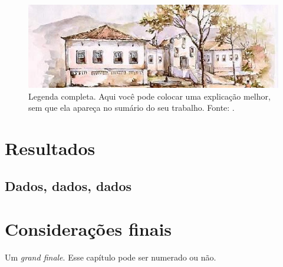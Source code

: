 \documentclass[
	12pt,				%
	openright,			%
	twoside,			%
	a4paper,			%
	english,			%
	brazil				%
	]{abntex2}
\begin{document}
\lipsum[30]

\begin{figure}[htbp]
	\centering
	\includegraphics[scale=0.4]{ichs2} %
	\caption[Legenda reduzida - aparece no sumário]{Legenda completa. Aqui você pode colocar uma explicação melhor, sem que ela apareça no sumário do seu trabalho. Fonte: \cite[p.~117]{boyle1772}.}
	\label{fig:309}
\end{figure}
\chapter{Resultados}

\section{Dados, dados, dados}
\lipsum[21-22]


\chapter{Considerações finais} %

Um \emph{grand finale}. Esse capítulo pode ser numerado ou não.

\postextual
\end{document}
